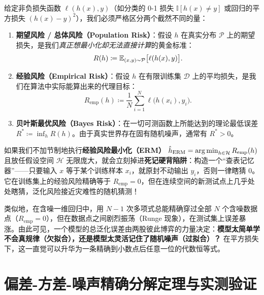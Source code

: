 给定非负损失函数 $\ell(h(x), y)$（如分类的 0-1 损失 $\mathbb{I}[h(x)\neq y]$ 或回归的平方损失 $(h(x)-y)^2$），我们必须严格区分两个截然不同的量：

\begin{defBox}
\begin{definition}\label{def:v4-risks}
\begin{enumerate}
  \item \textbf{期望风险 / 总体风险（Population Risk）}：假设 $h$ 在真实分布 $\mathcal{P}$ 上的期望损失，是我们\emph{真正想最小化却无法直接计算}的黄金标准：
  \[
    R(h) \coloneqq \mathbb{E}_{(x, y) \sim \mathcal{P}}\big[\ell(h(x), y)\big].
  \]
  \item \textbf{经验风险（Empirical Risk）}：假设 $h$ 在有限训练集 $\mathcal{D}$ 上的平均损失，是我们在算法中实际能算出来的代理目标：
  \[
    R_{\mathrm{emp}}(h) \coloneqq \frac{1}{N}\sum_{i=1}^N \ell\big(h(x_i), y_i\big).
  \]
  \item \textbf{贝叶斯最优风险（Bayes Risk）}：在一切可测函数上所能达到的理论最低误差 $R^* \coloneqq \inf_{h} R(h)$。由于真实世界存在固有随机噪声，通常有 $R^* > 0$。
\end{enumerate}
\end{definition}
\end{defBox}

如果我们不加节制地执行\textbf{经验风险最小化（ERM）} $\hat{h}_{\mathrm{ERM}} = \operatorname*{arg\,min}_{h \in \mathcal{H}} R_{\mathrm{emp}}(h)$ 且放任假设空间 $\mathcal{H}$ 无限庞大，就会立刻掉进\textbf{死记硬背陷阱}：构造一个“查表记忆器”——只要输入 $x$ 等于某个训练样本 $x_i$，就原封不动输出 $y_i$，否则一律瞎猜 $0$。它在训练集上的经验风险精确等于 $R_{\mathrm{emp}} = 0$，但在连续空间的新测试点上几乎处处瞎猜，泛化风险接近灾难性的随机猜测！

类似地，在含噪一维回归中，用 $N-1$ 次多项式总能精确穿过全部 $N$ 个含噪数据点（$R_{\mathrm{emp}} = 0$），但在数据点之间剧烈振荡（Runge 现象），在测试集上误差暴涨。由此可见，一个模型的总泛化误差由两股彼此博弈的力量决定：\textbf{模型太简单学不会真规律（欠拟合），还是模型太灵活记住了随机噪声（过拟合）？} 在平方损失下，这一直觉可以升华为一条精确到小数点后任意一位的代数恒等式。

\section{偏差-方差-噪声精确分解定理与实测验证}

